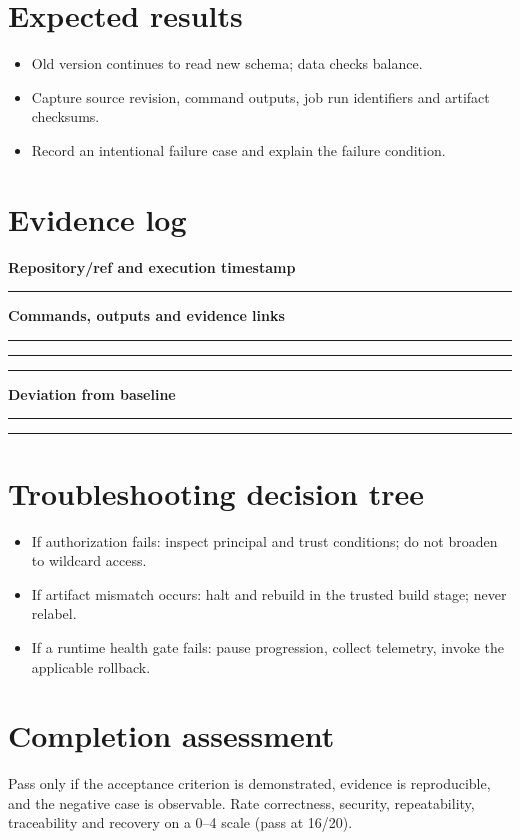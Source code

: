 \documentclass[10pt,letterpaper]{article}
\begin{document}
\section{Expected results}
\begin{itemize}
\item Old version continues to read new schema; data checks balance.
\item Capture source revision, command outputs, job run identifiers and artifact checksums.
\item Record an intentional failure case and explain the failure condition.
\end{itemize}

\section{Evidence log}
\textbf{Repository/ref and execution timestamp}\par
\noindent\rule{\linewidth}{0.35pt}\par\vspace{0.7em}
\textbf{Commands, outputs and evidence links}\par
\noindent\rule{\linewidth}{0.35pt}\par\vspace{0.7em}
\noindent\rule{\linewidth}{0.35pt}\par\vspace{0.7em}
\noindent\rule{\linewidth}{0.35pt}\par\vspace{0.7em}
\textbf{Deviation from baseline}\par
\noindent\rule{\linewidth}{0.35pt}\par\vspace{0.7em}
\noindent\rule{\linewidth}{0.35pt}\par\vspace{0.7em}

\section{Troubleshooting decision tree}
\begin{itemize}
\item If authorization fails: inspect principal and trust conditions; do not broaden to wildcard access.
\item If artifact mismatch occurs: halt and rebuild in the trusted build stage; never relabel.
\item If a runtime health gate fails: pause progression, collect telemetry, invoke the applicable rollback.
\end{itemize}

\section{Completion assessment}
Pass only if the acceptance criterion is demonstrated, evidence is reproducible, and the negative case is observable. Rate correctness, security, repeatability, traceability and recovery on a 0--4 scale (pass at 16/20).
\end{document}
